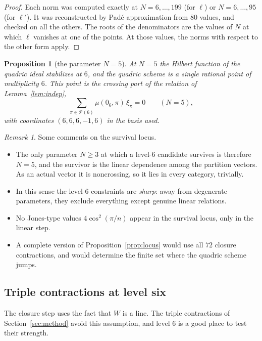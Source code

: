 \documentclass[11pt]{amsart}
\newtheorem{proposition}[theorem]{Proposition}
\theoremstyle{definition}
\theoremstyle{remark}
\newtheorem{remark}[theorem]{Remark}
\theoremstyle{plain}
\numberwithin{equation}{section}
\numberwithin{table}{section}
\newcommand{\Pp}{\mathcal{P}}
\begin{document}
\begin{proof}
Each norm was computed exactly at $N=6,\dots,199$ (for $\ell$) or $N=6,\dots,95$ (for $\ell'$). It was reconstructed by Pad{\'e} approximation from $80$ values, and checked on all the others. The roots of the denominators are the values of $N$ at which $\ell$ vanishes at one of the points. At those values, the norms with respect to the other form apply.
\end{proof}

\begin{proposition}[the parameter $N=5$]\label{prop:nfive}
At $N=5$ the Hilbert function of the quadric ideal stabilizes at $6$, and the quadric scheme is a single rational point of multiplicity $6$. This point is the crossing part of the relation of Lemma~\ref{lem:indep},
\[
\sum_{\pi\in\Pp(6)}\mu(0_6,\pi)\,\xi_\pi=0\qquad(N=5),
\]
with coordinates $(6,6,6,-1,6)$ in the basis used.
\end{proposition}

\begin{remark}
Some comments on the survival locus.
\begin{itemize}
\item The only parameter $N\ge3$ at which a level-$6$ candidate survives is therefore $N=5$, and the survivor is the linear dependence among the partition vectors. As an actual vector it is noncrossing, so it lies in every category, trivially.
\item In this sense the level-$6$ constraints are \emph{sharp}: away from degenerate parameters, they exclude everything except genuine linear relations.
\item No Jones-type values $4\cos^2(\pi/n)$ appear in the survival locus, only in the linear step.
\item A complete version of Proposition~\ref{prop:locus} would use all $72$ closure contractions, and would determine the finite set where the quadric scheme jumps.
\end{itemize}
\end{remark}

\subsection{Triple contractions at level six}

The closure step uses the fact that $W$ is a line. The triple contractions of Section~\ref{sec:method} avoid this assumption, and level $6$ is a good place to test their strength.
\end{document}
